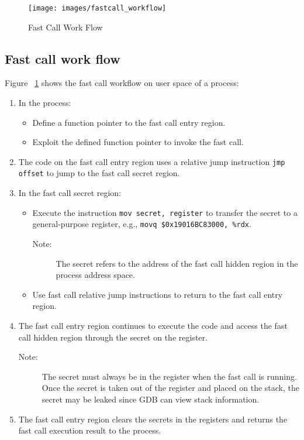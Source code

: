 \begin{figure}[tbp]
  \centering
  \texttt{[image: images/fastcall\_workflow]}
  \caption[Short description]{Fast Call Work Flow}
  \label{fig:fastcall_workflow}
\end{figure}
\subsection{Fast call work flow}
Figure ~\ref{fig:fastcall_workflow} shows the fast call workflow on user space of a process:
\begin{enumerate}
  \item In the process:
    \begin{itemize}
      \item Define a function pointer to the fast call entry region.
      \item Exploit the defined function pointer to invoke the fast call.
    \end{itemize}
  \item The code on the fast call entry region uses a relative jump instruction \verb|jmp offset| to jump to the fast call secret region.
  \item In the fast call secret region:  
    \begin{itemize}
      \item Execute the instruction \verb|mov secret, register| to transfer the secret to a general-purpose register,  e.g., \verb|movq $0x19016BC83000, %rdx|.
        \begin{description}
          \item[Note:] The secret refers to the address of the fast call hidden region in the process address space.
        \end{description}
      \item Use fast call relative jump instructions to return to the fast call entry region.
    \end{itemize}
  \item The fast call entry region continues to execute the code and access the fast call hidden region through the secret on the register.
  \begin{description}
    \item[Note:] The secret must always be in the register when the fast call is running. 
    Once the secret is taken out of the register and placed on the stack, 
    the secret  may be leaked since GDB can view stack information.
  \end{description}
  \item The fast call entry region clears the secrets in the registers and returns the fast call execution result to the process.
\end{enumerate}

